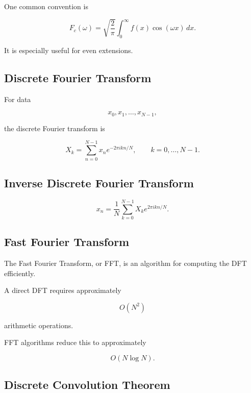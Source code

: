 One common convention is

\[
\boxed{
F_c(\omega)
=
\sqrt{
\frac{2}{\pi}
}
\int_0^\infty
f(x)\cos(\omega x)
\,dx.
}
\]

It is especially useful for even extensions.

\subsection{Discrete Fourier Transform}
\label{subsec:discrete-fourier-transform-reference}

For data

\[
x_0,x_1,\ldots,x_{N-1},
\]

the discrete Fourier transform is

\[
\boxed{
X_k
=
\sum_{n=0}^{N-1}
x_n
e^{-2\pi i kn/N},
\qquad
k=0,\ldots,N-1.
}
\]

\subsection{Inverse Discrete Fourier Transform}
\label{subsec:inverse-dft-reference}

\[
\boxed{
x_n
=
\frac1N
\sum_{k=0}^{N-1}
X_k
e^{2\pi i kn/N}.
}
\]

\subsection{Fast Fourier Transform}
\label{subsec:fft-reference}

The Fast Fourier Transform, or FFT, is an algorithm for computing the DFT
efficiently.

A direct DFT requires approximately

\[
\boxed{
O(N^2)
}
\]

arithmetic operations.

FFT algorithms reduce this to approximately

\[
\boxed{
O(N\log N).
}
\]

\subsection{Discrete Convolution Theorem}
\label{subsec:dft-convolution-theorem}

